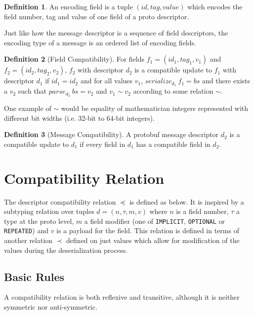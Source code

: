 \documentclass[11pt]{article}
\theoremstyle{definition}
\newtheorem{definition}{Definition}[section]
\theoremstyle{plain}
\begin{document}
\begin{definition}
	An encoding field is a tuple $(id, tag, value)$ which encodes the field
	number, tag and value of one field of a proto descriptor.
\end{definition}

Just like how the message descriptor is a sequence of field descriptors, the
encoding type of a message is an ordered list of encoding fields.

\begin{definition}[Field Compatibility]
	For fields $f_1 = (id_1, tag_1, v_1)$ and $f_2 = (id_2, tag_2, v_2)$, $f_2$
	with descriptor $d_2$ is a compatible update to $f_1$ with descriptor $d_1$ if
	$id_1 = id_2$ and for all values $v_1$, $serialize_{d_1}\ f_1 = bs$ and there
	exists a $v_2$ such that $parse_{d_2}\ bs = v_2$ and $v_1 \sim v_2$ according to
	some relation $\sim$.
\end{definition}

One example of $\sim$ would be equality of mathematician integers represented with
different bit widths (i.e. 32-bit to 64-bit integers).

\begin{definition}[Message Compatibility]
	A protobuf message descriptor $d_2$ is a compatible update to $d_1$ if every
	field in $d_1$ has a compatible field in $d_2$.
\end{definition}

\section{Compatibility Relation}

The descriptor compatibility relation $\preceq$ is defined as below. It is inspired by
a subtyping relation over tuples $d = (n, \tau, m, v)$ where $n$ is a field number,
$\tau$ a type at the proto level, $m$ a field modifier (one of \texttt{IMPLICIT},
\texttt{OPTIONAL} or \texttt{REPEATED}) and $v$ is a payload for the field.
This relation is defined in terms of another relation $\prec$ defined on just values
which allow for modification of the values during the deserialization process.

\subsection{Basic Rules}

A compatibility relation is both reflexive and transitive, although it is
neither symmetric nor anti-symmetric.  
\end{document}
